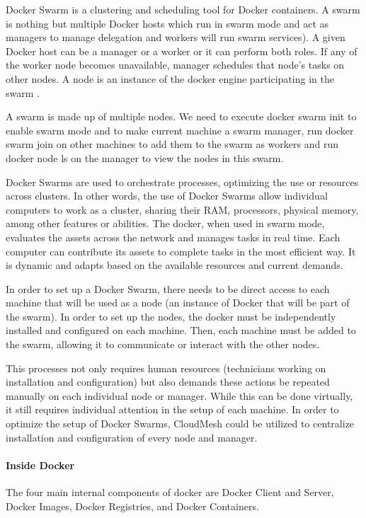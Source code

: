 \documentclass[sigconf]{acmart}
\begin{document}
	Docker Swarm is a clustering and scheduling tool for Docker containers. A swarm is nothing but multiple Docker hosts which run in swarm mode and act as managers to manage delegation and workers will run swarm services). A given Docker host can be a manager or a worker or it can perform both roles. If any of the worker node becomes unavailable, manager schedules that node's tasks on other nodes. A node is an instance of the docker engine participating in the swarm \cite{dockerdoc2017}.
	
	A swarm is made up of multiple nodes. We need to execute docker swarm init to enable swarm mode and to make current machine a swarm manager, run docker swarm join on other machines to add them to the swarm as workers and run docker node ls on the manager to view the nodes in this swarm.
	
	Docker Swarms are used to orchestrate processes, optimizing the use or resources across clusters.  In other words, the use of Docker Swarms allow individual computers to work as a cluster, sharing their RAM, processors, physical memory, among other features or abilities.    The docker, when used in swarm mode, evaluates the assets across the network and manages tasks in real time. Each computer can contribute its assets to complete tasks in the most efficient way. It is dynamic and adapts based on the available resources and current demands.   
	
	In order to set up a Docker Swarm, there needs to be direct access to each machine that will be used as a node (an instance of Docker that will be part of the swarm).  In order to set up  the nodes, the docker must be independently installed and configured on each machine.  Then, each machine must be added to the swarm, allowing it to communicate or interact with the other nodes.  
	
	This processes not only requires human resources (technicians working on installation and configuration) but also demands these actions be repeated manually on each individual node or manager. While this can be done virtually, it still requires individual attention in the setup of each machine.  In order to optimize the setup of Docker Swarms, CloudMesh could be utilized to centralize installation and configuration of every node and manager.  
	
	
	\paragraph{Inside Docker}
	The four main internal components of docker are Docker Client and Server, Docker Images, Docker Registries, and Docker Containers.
\end{document}
